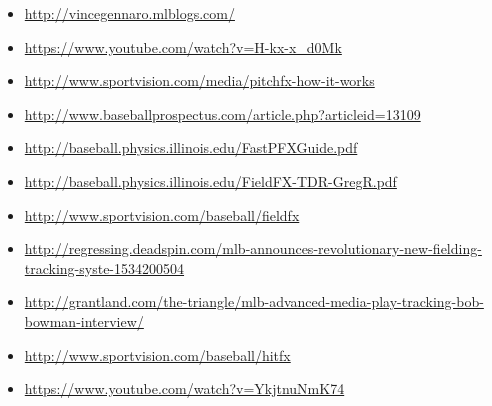 \begin{itemize}
\item
  \url{http://vincegennaro.mlblogs.com/}
\item
  \url{https://www.youtube.com/watch?v=H-kx-x_d0Mk}
\item
  \url{http://www.sportvision.com/media/pitchfx-how-it-works}
\item
  \url{http://www.baseballprospectus.com/article.php?articleid=13109}
\item
  \url{http://baseball.physics.illinois.edu/FastPFXGuide.pdf}
\item
  \url{http://baseball.physics.illinois.edu/FieldFX-TDR-GregR.pdf}
\item
  \url{http://www.sportvision.com/baseball/fieldfx}
\item
  \url{http://regressing.deadspin.com/mlb-announces-revolutionary-new-fielding-tracking-syste-1534200504}
\item
  \url{http://grantland.com/the-triangle/mlb-advanced-media-play-tracking-bob-bowman-interview/}
\item
  \url{http://www.sportvision.com/baseball/hitfx}
\item
  \url{https://www.youtube.com/watch?v=YkjtnuNmK74}
\end{itemize}
